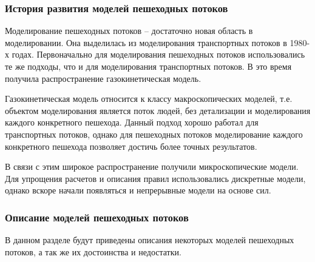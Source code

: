 \subsubsection{История развития моделей пешеходных потоков}
\label{sub:domain:models:history}

Моделирование пешеходных потоков – достаточно новая область в моделировании. Она выделилась из моделирования транспортных потоков в 1980-х годах.
Первоначально для моделирования пешеходных потоков использовались те же подходы, что и для моделирования транспортных потоков.
В это время получила распространение газокинетическая модель.

Газокинетическая модель относится к классу макроскопических моделей, т.е. объектом моделирования является поток людей, без детализации и моделирования каждого конкретного пешехода.
Данный подход хорошо работал для транспортных потоков, однако для пешеходных потоков моделирование каждого конкретного пешехода позволяет достичь более точных результатов.

В связи с этим широкое распространение получили микроскопические модели. Для упрощения расчетов и описания правил использовались дискретные модели, однако вскоре начали появляться и непрерывные модели на основе сил.

\subsubsection{Описание моделей пешеходных потоков}
\label{sub:domain:models:descriptions}

В данном разделе будут приведены описания некоторых моделей пешеходных потоков, а так же их достоинства и недостатки.

